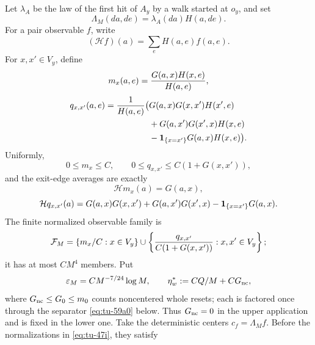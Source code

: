 \documentclass[12pt,reqno]{amsart}
\theoremstyle{plain}
\theoremstyle{definition}
\theoremstyle{remark}
\numberwithin{equation}{section}
\begin{document}
Let \(\lambda_A\) be the law of the first hit of \(A_y\) by a walk started
at \(o_y\), and set
\begin{equation}
                 \Lambda_M(da,de)=\lambda_A(da)H(a,de).     \label{eq:tu-47e}
\end{equation}
For a pair observable \(f\), write
\begin{equation}
                 (\mathcal{H}f)(a)=\sum_eH(a,e)f(a,e).         \label{eq:tu-47f}
\end{equation}
For \(x,x'\in V_y\), define
\begin{equation}
 m_x(a,e)={G(a,x)H(x,e)\over H(a,e)},                       \label{eq:tu-47g}
\end{equation}
\begin{equation}
\begin{aligned}
q_{x,x'}(a,e)=\frac{1}{H(a,e)}\big(&G(a,x)G(x,x')H(x',e)\\
&+G(a,x')G(x',x)H(x,e)\\
&-{\bf1}_{\{x=x'\}}G(a,x)H(x,e)\big).
\end{aligned}                                             \label{eq:tu-47h}
\end{equation}
Uniformly,
\begin{equation}
 0\le m_x\le C,\qquad0\le q_{x,x'}\le C(1+G(x,x')),       \label{eq:tu-47h-prime}
\end{equation}
and the exit-edge averages are exactly
\[
 \mathcal{H}m_x(a)=G(a,x),
\]
\begin{equation}
 \mathcal{H}q_{x,x'}(a)=G(a,x)G(x,x')+G(a,x')G(x',x)
             -{\bf1}_{\{x=x'\}}G(a,x).                    \label{eq:tu-47h-doubleprime}
\end{equation}
The finite normalized observable family is
\begin{equation}
 \mathcal{F}_M=\{m_x/C:x\in V_y\}\cup
 \left\{{q_{x,x'}\over C(1+G(x,x'))}:x,x'\in V_y\right\}; \label{eq:tu-47i}
\end{equation}
it has at most \(CM^4\) members.  Put
\begin{equation}
 \varepsilon_M=CM^{-7/24}\log M,
 \qquad
 \eta_w^*:=CQ/M+CG_{\rm nc},                                \label{eq:tu-48a}
\end{equation}
where \(G_{\rm nc}\le G_0\le m_0\) counts noncentered whole resets; each
is factored once through the separator \eqref{eq:tu-59a0} below.  Thus
\(G_{\rm nc}=0\) in the upper application and is fixed in the lower one.
Take the deterministic centers \(c_f=\Lambda_Mf\).  Before the
normalizations in \eqref{eq:tu-47i}, they satisfy
\end{document}
